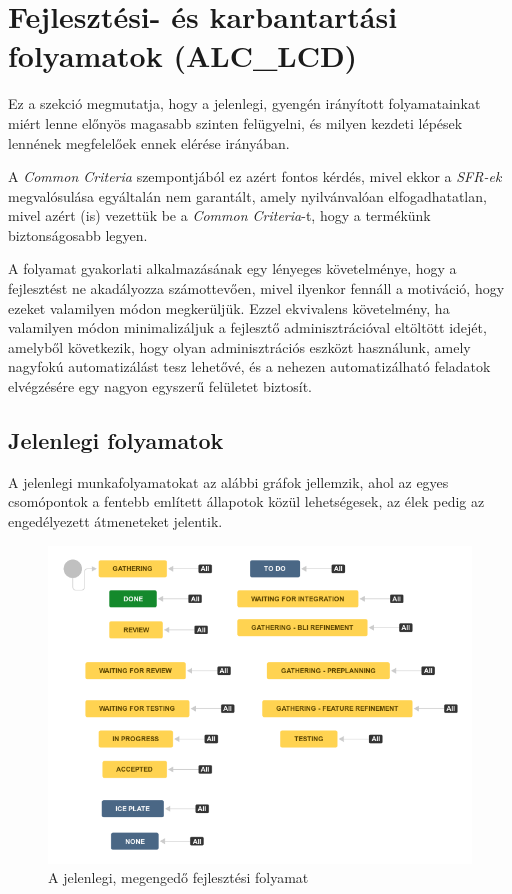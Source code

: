 \section{Fejlesztési- és karbantartási folyamatok (ALC\_LCD)}
Ez a szekció megmutatja, hogy a jelenlegi, gyengén irányított folyamatainkat miért lenne előnyös
magasabb szinten felügyelni, és milyen kezdeti lépések lennének megfelelőek ennek elérése irányában.

A \emph{Common Criteria} szempontjából ez azért fontos kérdés, mivel ekkor a \emph{SFR-ek}
megvalósulása egyáltalán nem garantált, amely nyilvánvalóan elfogadhatatlan, mivel azért (is)
vezettük be a \emph{Common Criteria}-t, hogy a termékünk biztonságosabb legyen.

A folyamat gyakorlati alkalmazásának egy lényeges követelménye, hogy a fejlesztést ne akadályozza
számottevően, mivel ilyenkor fennáll a motiváció, hogy ezeket valamilyen módon megkerüljük. Ezzel
ekvivalens követelmény, ha valamilyen módon minimalizáljuk a fejlesztő adminisztrációval eltöltött
idejét, amelyből következik, hogy olyan adminisztrációs eszközt használunk, amely nagyfokú
automatizálást tesz lehetővé, és a nehezen automatizálható feladatok elvégzésére egy nagyon egyszerű
felületet biztosít.

\subsection{Jelenlegi folyamatok}
A jelenlegi munkafolyamatokat az alábbi gráfok jellemzik, ahol az egyes csomópontok a fentebb
említett állapotok közül lehetségesek, az élek pedig az engedélyezett átmeneteket jelentik.

\begin{figure}[h]
    \centering
    \includegraphics[width=\textwidth, height=0.4\textheight, keepaspectratio]{figures/oldfeature.png}
    \caption{A jelenlegi, megengedő fejlesztési folyamat}
    \label{fig:oldfeature}
\end{figure}
\FloatBarrier
\pagebreak[3]

